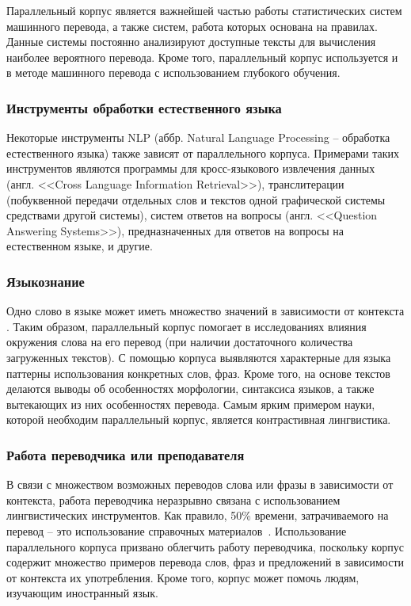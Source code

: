 Параллельный корпус является важнейшей частью работы статистических систем машинного перевода, а также систем, работа которых основана на правилах. 
Данные системы постоянно анализируют доступные тексты для вычисления наиболее вероятного перевода. 
Кроме того, параллельный корпус используется и в методе машинного перевода с использованием глубокого обучения.
	
\subsubsection{Инструменты обработки естественного языка}
	
Некоторые инструменты NLP (аббр. Natural Language Processing -- обработка естественного языка) также зависят от параллельного корпуса. 
Примерами таких инструментов являются программы для кросс-языкового извлечения данных (англ. <<Cross Language Information Retrieval>>), транслитерации (побуквенной передачи отдельных слов и текстов одной графической системы средствами другой системы), систем ответов на вопросы (англ. <<Question Answering Systems>>), предназначенных для ответов на вопросы на естественном языке, и другие.
	
\subsubsection{Языкознание}
	
Одно слово в языке может иметь множество значений в зависимости от контекста \cite{poibeau-MT-2017}. 
Таким образом, параллельный корпус помогает в исследованиях влияния окружения слова на его перевод (при наличии достаточного количества загруженных текстов). 
С помощью корпуса выявляются характерные для языка паттерны использования конкретных слов, фраз. 
Кроме того, на основе текстов делаются выводы об особенностях морфологии, синтаксиса языков, а также вытекающих из них особенностях перевода. 
Самым ярким примером науки, которой необходим параллельный корпус, является контрастивная лингвистика.
	
\subsubsection{Работа переводчика или преподавателя}
	
В связи с множеством возможных переводов слова или фразы в зависимости от контекста, работа переводчика неразрывно связана с использованием лингвистических инструментов. 
Как правило, 50\% времени, затрачиваемого на перевод -- это использование справочных материалов~\cite{rura-tranlator-aid-2008}. 
Использование параллельного корпуса призвано облегчить работу переводчика, поскольку корпус содержит множество примеров перевода слов, фраз и предложений в зависимости от контекста их употребления. 
Кроме того, корпус может помочь людям, изучающим иностранный язык.

